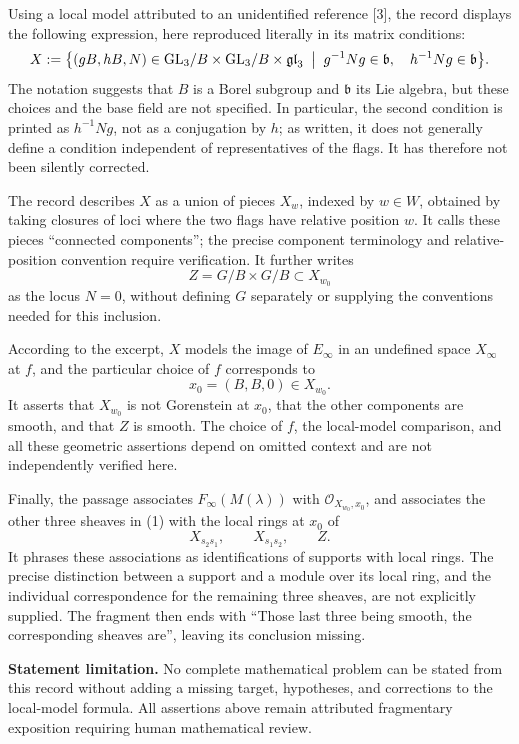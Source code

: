 \documentclass[11pt]{article}
\begin{document}
Using a local model attributed to an unidentified reference [3], the record displays the following expression, here reproduced literally in its matrix conditions:
\[
X:=\bigl\{(gB,hB,N)\in
\mathrm{GL}_3/B\times\mathrm{GL}_3/B\times\mathfrak{gl}_3
\;\bigm|\;
 g^{-1}Ng\in\mathfrak b,\quad h^{-1}Ng\in\mathfrak b
\bigr\}.
\]
The notation suggests that \(B\) is a Borel subgroup and \(\mathfrak b\) its Lie algebra, but these choices and the base field are not specified. In particular, the second condition is printed as \(h^{-1}Ng\), not as a conjugation by \(h\); as written, it does not generally define a condition independent of representatives of the flags. It has therefore not been silently corrected.

The record describes \(X\) as a union of pieces \(X_w\), indexed by \(w\in W\), obtained by taking closures of loci where the two flags have relative position \(w\). It calls these pieces ``connected components''; the precise component terminology and relative-position convention require verification. It further writes
\[
Z=G/B\times G/B\subset X_{w_0}
\]
as the locus \(N=0\), without defining \(G\) separately or supplying the conventions needed for this inclusion.

According to the excerpt, \(X\) models the image of \(E_\infty\) in an undefined space \(X_\infty\) at \(f\), and the particular choice of \(f\) corresponds to
\[
x_0=(B,B,0)\in X_{w_0}.
\]
It asserts that \(X_{w_0}\) is not Gorenstein at \(x_0\), that the other components are smooth, and that \(Z\) is smooth. The choice of \(f\), the local-model comparison, and all these geometric assertions depend on omitted context and are not independently verified here.

Finally, the passage associates \(F_\infty(M(\lambda))\) with \(\mathcal O_{X_{w_0},x_0}\), and associates the other three sheaves in (1) with the local rings at \(x_0\) of
\[
X_{s_2s_1},\qquad X_{s_1s_2},\qquad Z.
\]
It phrases these associations as identifications of supports with local rings. The precise distinction between a support and a module over its local ring, and the individual correspondence for the remaining three sheaves, are not explicitly supplied. The fragment then ends with ``Those last three being smooth, the corresponding sheaves are'', leaving its conclusion missing.

\textbf{Statement limitation.}
No complete mathematical problem can be stated from this record without adding a missing target, hypotheses, and corrections to the local-model formula. All assertions above remain attributed fragmentary exposition requiring human mathematical review.
\end{document}
